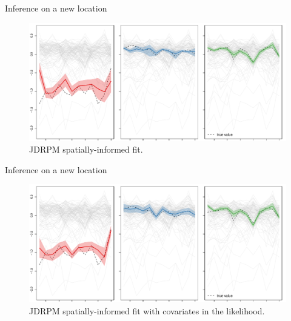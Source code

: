 \documentclass[
	11pt, %
 xcolor={dvipsnames,svgnames}
]{beamer}
\begin{document}
\begin{frame}{Inference on a new location}
\begin{figure}
\centering
    \includegraphics[width=1\linewidth]{Testing/new kriking/JDRPM - NA fit - space_VERTICAL_BLACK.pdf}
    \caption[Inference analysis of JDRPM on new locations, spatial information]{JDRPM spatially-informed fit.}
\end{figure}
\end{frame}
\begin{frame}{Inference on a new location}
\begin{figure}
\centering
    \includegraphics[width=1\linewidth]{Testing/new kriking/JDRPM - NA fit - space + Xlk_VERTICAL_BLACK.pdf}
    \caption[Inference analysis of JDRPM on new locations, spatial information, covariates in the likelihood]{JDRPM spatially-informed fit with covariates in the likelihood.}
\end{figure}
\end{frame}
\end{document}
